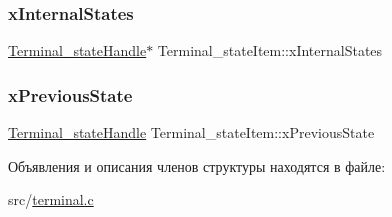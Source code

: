 \mbox{\label{struct_terminal__state_item_ad50dafaf75a0e863d755cf80294b1f2c}} 
\subsubsection{\texorpdfstring{xInternalStates}{xInternalStates}}
{\footnotesize\ttfamily \mbox{\hyperlink{group__terminal_gadcd4acb437149111c071e40bccbac72a}{Terminal\+\_\+state\+Handle}}$\ast$ Terminal\+\_\+state\+Item\+::x\+Internal\+States}

\mbox{\label{struct_terminal__state_item_ae20c8d76321e1eb5a2b587a0aab777a2}} 
\subsubsection{\texorpdfstring{xPreviousState}{xPreviousState}}
{\footnotesize\ttfamily \mbox{\hyperlink{group__terminal_gadcd4acb437149111c071e40bccbac72a}{Terminal\+\_\+state\+Handle}} Terminal\+\_\+state\+Item\+::x\+Previous\+State}



Объявления и описания членов структуры находятся в файле\+:\begin{DoxyCompactItemize}
\item 
src/\mbox{\hyperlink{terminal_8c}{terminal.\+c}}\end{DoxyCompactItemize}
